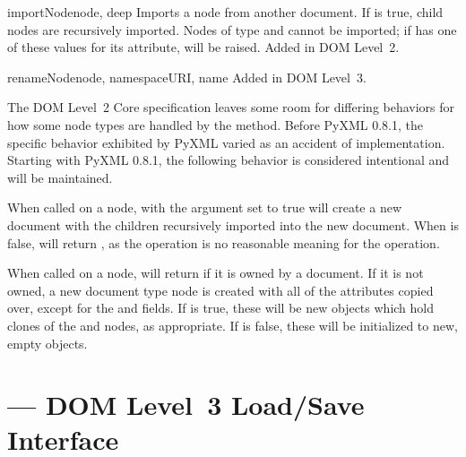 \documentclass{howto}
\begin{document}
\begin{methoddesc}[Document]{importNode}{node, deep}
  Imports a node  from another document.  If  is
  true, child nodes are recursively imported.  Nodes of type
   and  cannot be
  imported; if  has one of these values for its
   attribute, 
  will be raised.
  Added in DOM Level~2.
\end{methoddesc}

\begin{methoddesc}[Document]{renameNode}{node, namespaceURI, name}
  Added in DOM Level~3.
\end{methoddesc}



 The DOM Level~2 Core
specification leaves some room for differing behaviors for how some
node types are handled by the  method.
Before PyXML 0.8.1, the specific behavior exhibited by PyXML varied as
an accident of implementation.  Starting with PyXML 0.8.1, the
following behavior is considered intentional and will be maintained.

When called on a  node,  with the
 argument set to true will create a new document with the
children recursively imported into the new document.  When 
is false,  will return , as the
operation is no reasonable meaning for the operation.

When called on a  node,  will
return  if it is owned by a document.  If it is not owned,
a new document type node is created with all of the attributes copied
over, except for the  and  fields.
If  is true, these will be new  objects
which hold clones of the  and  nodes, as
appropriate.  If  is false, these will be initialized to
new, empty  objects.



\section{ ---
         DOM Level~3 Load/Save Interface}

\end{document}
